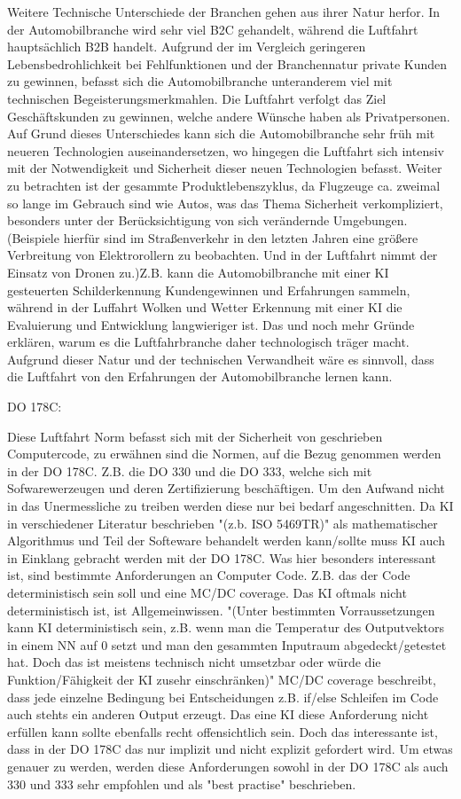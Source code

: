 Weitere Technische Unterschiede der Branchen gehen aus ihrer Natur herfor. In der Automobilbranche wird sehr viel B2C gehandelt, 
während die Luftfahrt hauptsächlich B2B handelt. Aufgrund der im Vergleich geringeren Lebensbedrohlichkeit bei Fehlfunktionen 
und der Branchennatur private Kunden zu gewinnen, befasst sich die Automobilbranche unteranderem viel mit technischen Begeisterungsmerkmahlen. 
Die Luftfahrt verfolgt das Ziel Geschäftskunden zu gewinnen, welche andere Wünsche haben als Privatpersonen.
Auf Grund dieses Unterschiedes kann sich die Automobilbranche sehr früh mit neueren Technologien auseinandersetzen, wo hingegen die 
Luftfahrt sich intensiv mit der Notwendigkeit und Sicherheit dieser neuen Technologien befasst. Weiter zu betrachten ist der gesammte Produktlebenszyklus, 
da Flugzeuge ca. zweimal so lange im Gebrauch sind wie Autos, was das Thema Sicherheit verkompliziert, besonders unter der Berücksichtigung 
von sich verändernde Umgebungen. (Beispiele hierfür sind im Straßenverkehr in den letzten Jahren eine größere Verbreitung von 
Elektrorollern zu beobachten. Und in der Luftfahrt nimmt der Einsatz von Dronen zu.)Z.B. kann die Automobilbranche mit einer KI 
gesteuerten Schilderkennung Kundengewinnen und Erfahrungen sammeln, während in der Luffahrt Wolken und Wetter Erkennung mit einer 
KI die Evaluierung und Entwicklung langwieriger ist. Das und noch mehr Gründe erklären, warum 
es die Luftfahrbranche daher technologisch träger macht. Aufgrund dieser Natur und der technischen Verwandheit wäre es sinnvoll, 
dass die Luftfahrt von den Erfahrungen der Automobilbranche lernen kann.


DO 178C:

Diese Luftfahrt Norm befasst sich mit der Sicherheit von geschrieben Computercode, zu erwähnen sind die Normen, auf die Bezug genommen werden in der 
DO 178C. Z.B. die DO 330 und die DO 333, welche sich mit Sofwarewerzeugen und deren Zertifizierung beschäftigen. Um den Aufwand nicht in das Unermessliche 
zu treiben werden diese nur bei bedarf angeschnitten. Da KI in verschiedener Literatur beschrieben "(z.b. ISO 5469TR)" als mathematischer 
Algorithmus und Teil der Softeware behandelt werden kann/sollte muss KI auch in Einklang gebracht werden mit der DO 178C. Was hier besonders interessant 
ist, sind bestimmte Anforderungen an Computer Code. Z.B. das der Code deterministisch sein soll und eine MC/DC coverage. Das KI oftmals nicht deterministisch 
ist, ist Allgemeinwissen. "(Unter bestimmten Vorraussetzungen kann KI deterministisch sein, z.B. wenn man die Temperatur des Outputvektors in einem NN auf 0 setzt 
und man den gesammten Inputraum abgedeckt/getestet hat. Doch das ist meistens technisch nicht umsetzbar oder würde die Funktion/Fähigkeit der KI zusehr einschränken)" 
MC/DC coverage beschreibt, dass jede einzelne Bedingung bei Entscheidungen z.B. if/else Schleifen im Code auch stehts ein anderen Output erzeugt. 
Das eine KI diese Anforderung nicht erfüllen kann sollte ebenfalls recht offensichtlich sein. Doch das interessante ist, dass in der 
DO 178C das nur implizit und nicht explizit gefordert wird. Um etwas genauer zu werden, werden diese Anforderungen sowohl in der DO 178C als auch 330 und 333 sehr 
empfohlen und als "best practise" beschrieben.


